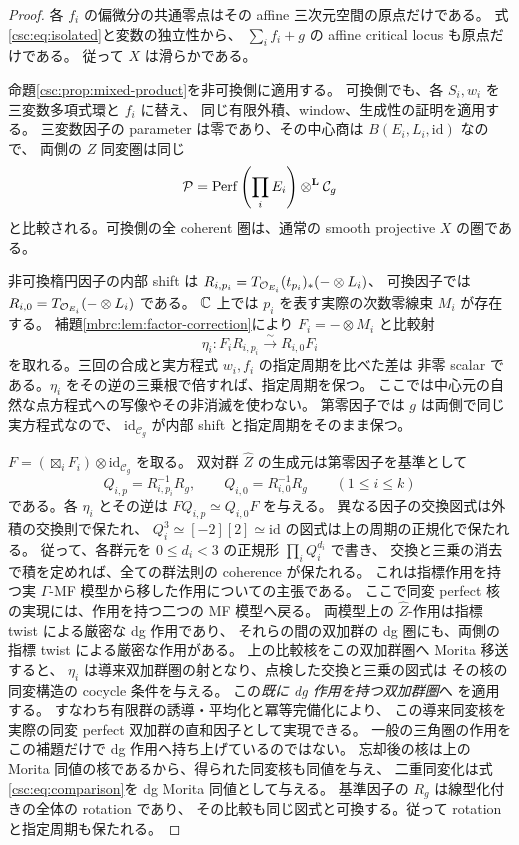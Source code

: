 \begin{proof}
各 $f_i$ の偏微分の共通零点はその affine 三次元空間の原点だけである。
式\eqref{csc:eq:isolated}と変数の独立性から、
$\sum_i f_i+g$ の affine critical locus も原点だけである。
従って $X$ は滑らかである。

命題\ref{csc:prop:mixed-product}を非可換側に適用する。
可換側でも、各 $S_i,w_i$ を三変数多項式環と $f_i$ に替え、
同じ有限外積、window、生成性の証明を適用する。
三変数因子の parameter は零であり、その中心商は $B(E_i,L_i,\mathrm{id})$ なので、
両側の $Z$ 同変圏は同じ
\[
 \mathcal P=\operatorname{Perf}\left(\prod_iE_i\right)\otimes^{\mathbf L}\mathcal C_g
\]
と比較される。可換側の全 coherent 圏は、通常の smooth projective $X$ の圏である。

非可換楕円因子の内部 shift は
$R_{i,p_i}=T_{\mathcal O_{E_i}}(t_{p_i})_*(-\otimes L_i)$、
可換因子では $R_{i,0}=T_{\mathcal O_{E_i}}(-\otimes L_i)$ である。
$\mathbb C$ 上では $p_i$ を表す実際の次数零線束 $M_i$ が存在する。
補題\ref{mbrc:lem:factor-correction}により
$F_i=-\otimes M_i$ と比較射
\[
 \eta_i:F_iR_{i,p_i}\xrightarrow{\sim}R_{i,0}F_i
\]
を取れる。三回の合成と実方程式 $w_i,f_i$ の指定周期を比べた差は
非零 scalar である。$\eta_i$ をその逆の三乗根で倍すれば、指定周期を保つ。
ここでは中心元の自然な点方程式への写像やその非消滅を使わない。
第零因子では $g$ は両側で同じ実方程式なので、
$\mathrm{id}_{\mathcal C_g}$ が内部 shift と指定周期をそのまま保つ。

$F=(\boxtimes_iF_i)\otimes\mathrm{id}_{\mathcal C_g}$ を取る。
双対群 $\widehat Z$ の生成元は第零因子を基準として
\[
 Q_{i,p}=R_{i,p_i}^{-1}R_g,\qquad
 Q_{i,0}=R_{i,0}^{-1}R_g\qquad(1\leq i\leq k)
\]
である。各 $\eta_i$ とその逆は $FQ_{i,p}\simeq Q_{i,0}F$ を与える。
異なる因子の交換図式は外積の交換則で保たれ、
$Q_i^3\simeq[-2][2]\simeq\mathrm{id}$ の図式は上の周期の正規化で保たれる。
従って、各群元を $0\leq d_i<3$ の正規形 $\prod_iQ_i^{d_i}$ で書き、
交換と三乗の消去で積を定めれば、全ての群法則の coherence が保たれる。
これは指標作用を持つ実 $\Gamma$-MF 模型から移した作用についての主張である。
ここで同変 perfect 核の実現には、作用を持つ二つの MF 模型へ戻る。
両模型上の $\widehat Z$-作用は指標 twist による厳密な dg 作用であり、
それらの間の双加群の dg 圏にも、両側の指標 twist による厳密な作用がある。
上の比較核をこの双加群圏へ Morita 移送すると、
$\eta_i$ は導来双加群圏の射となり、点検した交換と三乗の図式は
その核の同変構造の cocycle 条件を与える。
この\emph{既に dg 作用を持つ双加群圏}へ
\cite[Lemma~8.6]{MEDElagin}を適用する。
すなわち有限群の誘導・平均化と冪等完備化により、
この導来同変核を実際の同変 perfect 双加群の直和因子として実現できる。
一般の三角圏の作用をこの補題だけで dg 作用へ持ち上げているのではない。
忘却後の核は上の Morita 同値の核であるから、得られた同変核も同値を与え、
二重同変化は式\eqref{csc:eq:comparison}を dg Morita 同値として与える。
基準因子の $R_g$ は線型化付きの全体の rotation であり、
その比較も同じ図式と可換する。従って rotation と指定周期も保たれる。
\end{proof}

